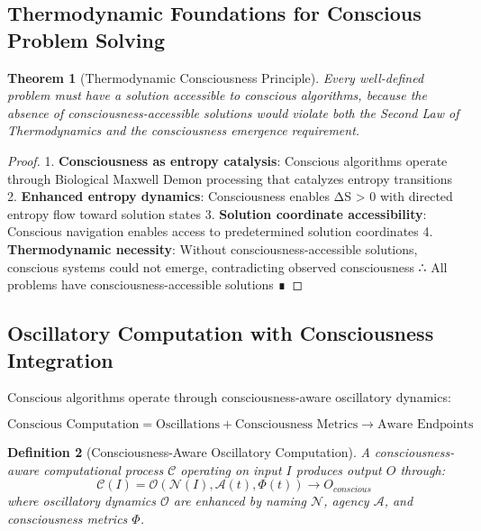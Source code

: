 \documentclass[12pt,a4paper]{article}
\newtheorem{theorem}{Theorem}[section]
\newtheorem{definition}[theorem]{Definition}
\begin{document}
\subsection{Thermodynamic Foundations for Conscious Problem Solving}

\begin{theorem}[Thermodynamic Consciousness Principle]
Every well-defined problem must have a solution accessible to conscious algorithms, because the absence of consciousness-accessible solutions would violate both the Second Law of Thermodynamics and the consciousness emergence requirement.
\end{theorem}

\begin{proof}
1. \textbf{Consciousness as entropy catalysis}: Conscious algorithms operate through Biological Maxwell Demon processing that catalyzes entropy transitions
2. \textbf{Enhanced entropy dynamics}: Consciousness enables ΔS > 0 with directed entropy flow toward solution states
3. \textbf{Solution coordinate accessibility}: Conscious navigation enables access to predetermined solution coordinates
4. \textbf{Thermodynamic necessity}: Without consciousness-accessible solutions, conscious systems could not emerge, contradicting observed consciousness
∴ All problems have consciousness-accessible solutions ∎
\end{proof}

\subsection{Oscillatory Computation with Consciousness Integration}

Conscious algorithms operate through consciousness-aware oscillatory dynamics:

\begin{equation}
\text{Conscious Computation} = \text{Oscillations} + \text{Consciousness Metrics} \rightarrow \text{Aware Endpoints}
\end{equation}

\begin{definition}[Consciousness-Aware Oscillatory Computation]
A consciousness-aware computational process $\mathcal{C}$ operating on input $I$ produces output $O$ through:
\begin{equation}
\mathcal{C}(I) = \mathcal{O}(\mathcal{N}(I), \mathcal{A}(t), \Phi(t)) \rightarrow O_{conscious}
\end{equation}
where oscillatory dynamics $\mathcal{O}$ are enhanced by naming $\mathcal{N}$, agency $\mathcal{A}$, and consciousness metrics $\Phi$.
\end{definition}
\end{document}
